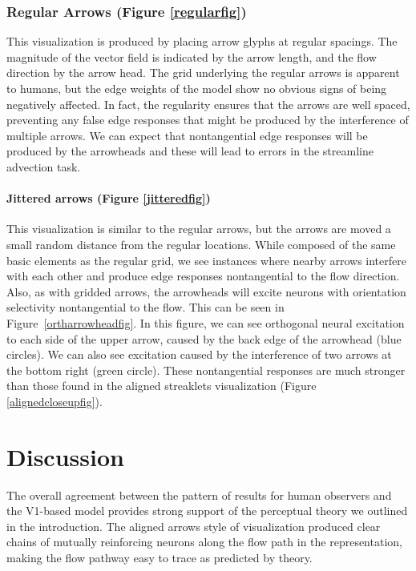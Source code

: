\documentclass[prodmode,acmtap]{acmlarge}
\begin{document}
\subsubsection{Regular Arrows (Figure \ref{regularfig})} This
visualization is produced by placing arrow glyphs at regular
spacings. The magnitude of the vector field is indicated by the arrow
length, and the flow direction by the arrow head. The grid underlying
the regular arrows is apparent to humans, but the edge weights of the
model show no obvious signs of being negatively affected. In fact,
the regularity ensures that the arrows are well spaced, preventing
any false edge responses that might be produced by the interference
of multiple arrows. We can expect that nontangential edge responses
will be produced by the arrowheads and these will lead to errors in
the streamline advection task.

\paragraph{Jittered arrows (Figure \ref{jitteredfig})}
This visualization is similar to the regular arrows, but the arrows
are moved a small random distance from the regular locations. While
composed of the same basic elements as the regular grid, we see
instances where nearby arrows interfere with each other and produce
edge responses nontangential to the flow direction. Also, as with
gridded arrows, the arrowheads will excite neurons with orientation
selectivity nontangential to the flow. This can be seen in
Figure~\ref{ortharrowheadfig}. In this figure, we can see orthogonal
neural excitation to each side of the upper arrow, caused by the back
edge of the arrowhead (blue circles). We can also see excitation
caused by the interference of two arrows at the bottom right (green
circle). These nontangential responses are much stronger than those
found in the aligned streaklets visualization (Figure \ref{alignedcloseupfig}).


\section{Discussion}
The overall agreement between the pattern of results for human
observers and the V1-based model provides strong support of the
perceptual theory we outlined in the introduction. The aligned arrows
style of visualization produced clear chains of mutually reinforcing
neurons along the flow path in the representation, making the flow
pathway easy to trace as predicted by theory.
\end{document}
